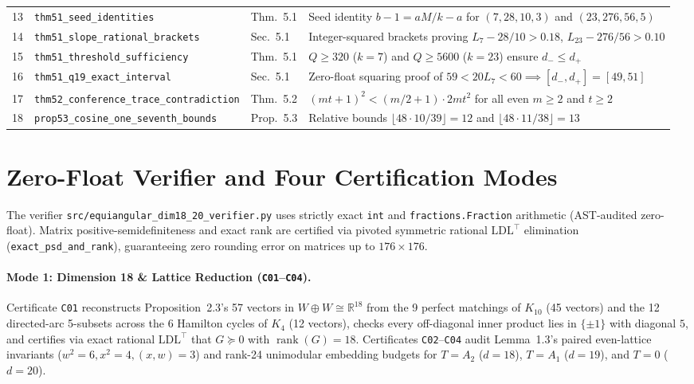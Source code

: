 \documentclass[10pt,twocolumn]{article}
\begin{document}
\begin{table}[tb]
\begin{tabular}{@{}rllp{6.5cm}@{}}
13 & \texttt{thm51\_seed\_identities} & Thm.~5.1 & Seed identity $b-1 = aM/k - a$ for $(7,28,10,3)$ and $(23,276,56,5)$ \\
14 & \texttt{thm51\_slope\_rational\_brackets} & Sec.~5.1 & Integer-squared brackets proving $L_7 - 28/10 > 0.18$, $L_{23}-276/56 > 0.10$ \\
15 & \texttt{thm51\_threshold\_sufficiency} & Thm.~5.1 & $Q \geq 320$ ($k=7$) and $Q \geq 5600$ ($k=23$) ensure $d_- \leq d_+$ \\
16 & \texttt{thm51\_q19\_exact\_interval} & Sec.~5.1 & Zero-float squaring proof of $59 < 20 L_7 < 60 \implies [d_-,d_+] = [49,51]$ \\
17 & \texttt{thm52\_conference\_trace\_contradiction} & Thm.~5.2 & $(mt+1)^2 < (m/2+1)\cdot 2mt^2$ for all even $m \geq 2$ and $t \geq 2$ \\
18 & \texttt{prop53\_cosine\_one\_seventh\_bounds} & Prop.~5.3 & Relative bounds $\lfloor 48\cdot 10/39\rfloor = 12$ and $\lfloor 48\cdot 11/38\rfloor = 13$ \\
\bottomrule
\end{tabular}
\end{table}

\section{Zero-Float Verifier and Four Certification Modes}
The verifier \nolinkurl{src/equiangular_dim18_20_verifier.py} uses strictly exact \texttt{int} and \texttt{fractions.Fraction} arithmetic (AST-audited zero-float). Matrix positive-semidefiniteness and exact rank are certified via pivoted symmetric rational $\mathrm{LDL}^\top$ elimination (\nolinkurl{exact_psd_and_rank}), guaranteeing zero rounding error on matrices up to $176\times 176$.

\paragraph{Mode 1: Dimension 18 \& Lattice Reduction (\texttt{C01}--\texttt{C04}).}
Certificate \texttt{C01} reconstructs Proposition~2.3's 57 vectors in $W \oplus W \cong \mathbb{R}^{18}$ from the 9 perfect matchings of $K_{10}$ (45 vectors) and the 12 directed-arc 5-subsets across the 6 Hamilton cycles of $K_4$ (12 vectors), checks every off-diagonal inner product lies in $\{\pm 1\}$ with diagonal $5$, and certifies via exact rational $\mathrm{LDL}^\top$ that $G \succeq 0$ with $\operatorname{rank}(G) = 18$. Certificates \texttt{C02}--\texttt{C04} audit Lemma~1.3's paired even-lattice invariants ($w^2=6, x^2=4, (x,w)=3$) and rank-24 unimodular embedding budgets for $T=A_2$ ($d=18$), $T=A_1$ ($d=19$), and $T=0$ ($d=20$).
\end{document}
